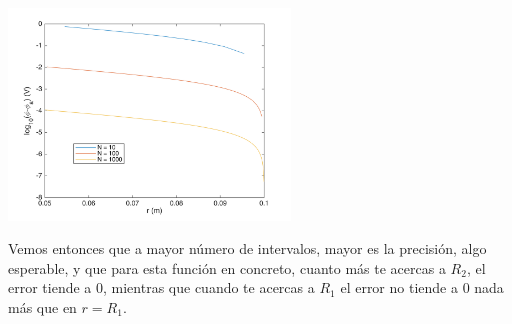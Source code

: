 \documentclass{article}
\begin{document}
  \begin{minipage}{8cm}
	\centering
	\includegraphics[width=7.5cm]{untitled2.png}
  \end{minipage}
  Vemos entonces que a mayor número de intervalos, mayor es la precisión, algo esperable, y que para esta función en concreto, cuanto más te acercas a $R_2$, el error tiende a 0, mientras que cuando te acercas a $R_1$ el error no tiende a 0 nada más que en $r=R_1$.
\end{document}
